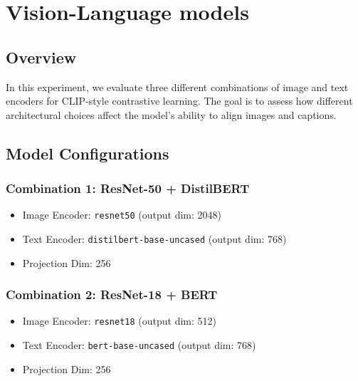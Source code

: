 \documentclass[11pt]{article}
\begin{document}


\section{Vision-Language models}

\subsection*{Overview}
In this experiment, we evaluate three different combinations of image and text encoders for CLIP-style contrastive learning. The goal is to assess how different architectural choices affect the model’s ability to align images and captions.

\subsection*{Model Configurations}
\subsubsection*{Combination 1: ResNet-50 + DistilBERT}
\begin{itemize}
    \item Image Encoder: \texttt{resnet50} (output dim: 2048)
    \item Text Encoder: \texttt{distilbert-base-uncased} (output dim: 768)
    \item Projection Dim: 256
\end{itemize}

\subsubsection*{Combination 2: ResNet-18 + BERT}
\begin{itemize}
    \item Image Encoder: \texttt{resnet18} (output dim: 512)
    \item Text Encoder: \texttt{bert-base-uncased} (output dim: 768)
    \item Projection Dim: 256
\end{itemize}
\end{document}
